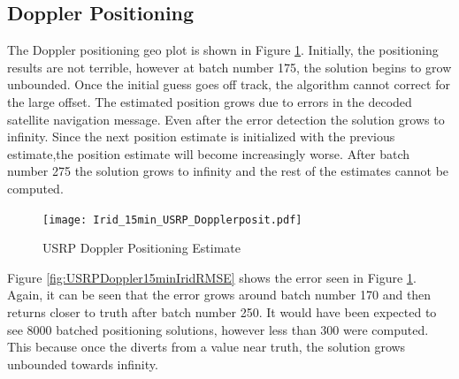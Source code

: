 \documentclass[12pt]{report}
\begin{document}
\subsection{Doppler Positioning}
The Doppler positioning geo plot is shown in Figure \ref{fig:USRPDoppler15minIridPosit}. Initially, the positioning results are not terrible, however at batch number 175, the solution begins to grow unbounded. Once the initial guess goes off track, the algorithm cannot correct for the large offset. The estimated position grows due to errors in the decoded satellite navigation message. Even after the error detection the solution grows to infinity. Since the next position estimate is initialized with the previous estimate,the position estimate will become increasingly worse. After batch number 275 the solution grows to infinity and the rest of the estimates cannot be computed. 

\begin{figure}[h!]
    \centering
    \texttt{[image: Irid\_15min\_USRP\_Dopplerposit.pdf]}
    \caption{USRP Doppler Positioning Estimate}
    \label{fig:USRPDoppler15minIridPosit}
\end{figure}

Figure \ref{fig:USRPDoppler15minIridRMSE} shows the error seen in Figure \ref{fig:USRPDoppler15minIridPosit}. Again, it can be seen that the error grows around batch number 170 and then returns closer to truth after batch number 250. It would have been expected to see 8000 batched positioning solutions, however less than 300 were computed. This because once the diverts from a value near truth, the solution grows unbounded towards infinity. 
\end{document}
